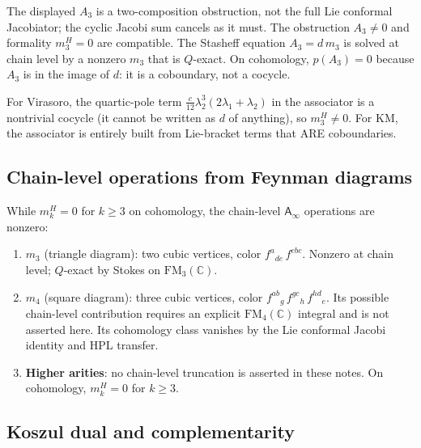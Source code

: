 \documentclass[11pt]{article}
\newcommand{\C}{\mathbb{C}}
\newcommand{\Ainf}{\mathsf{A}_{\infty}}
\newcommand{\FM}{\mathrm{FM}}
\begin{document}
\begin{remark}
The displayed $A_3$ is a two-composition obstruction, not the full
Lie conformal Jacobiator; the cyclic Jacobi sum cancels as it must.
The obstruction $A_3 \neq 0$ and formality $m_3^H = 0$ are
compatible.  The Stasheff equation $A_3 = d\, m_3$ is solved
at chain level by a nonzero $m_3$ that is $Q$-exact.
On cohomology, $p(A_3) = 0$ because $A_3$ is in the image
of $d$: it is a coboundary, not a cocycle.

For Virasoro, the quartic-pole term
$\tfrac{c}{12}\lambda_2^3(2\lambda_1+\lambda_2)$ in the
associator is a nontrivial cocycle (it cannot be written as
$d$ of anything), so $m_3^H \neq 0$.  For KM, the associator
is entirely built from Lie-bracket terms that ARE coboundaries.
\end{remark}

\subsection{Chain-level operations from Feynman diagrams}

While $m_k^H = 0$ for $k \geq 3$ on cohomology, the
chain-level $\Ainf$ operations are nonzero:

\begin{proposition}[Chain-level $\Ainf$ structure]
\label{prop:su2wn-chain}
\leavevmode
\begin{enumerate}
\item \textbf{$m_3$} (triangle diagram): two cubic vertices,
  color $f^{a}{}_{de}\, f^{ebc}$.  Nonzero at chain level;
  $Q$-exact by Stokes on $\FM_3(\C)$.

\item \textbf{$m_4$} (square diagram): three cubic vertices,
  color $f^{ab}{}_g\, f^{gc}{}_h\, f^{hd}{}_e$.  Its possible
  chain-level contribution requires an explicit $\FM_4(\C)$
  integral and is not asserted here.  Its cohomology class
  vanishes by the Lie conformal Jacobi identity and HPL transfer.

\item \textbf{Higher arities}: no chain-level truncation is
  asserted in these notes.  On cohomology, $m_k^H=0$ for
  $k\ge 3$.
\end{enumerate}
\end{proposition}

\subsection{Koszul dual and complementarity}
\end{document}
